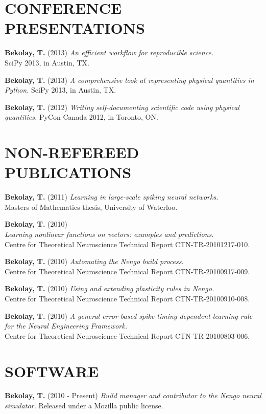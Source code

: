 \documentclass[line,margin]{res}
\begin{document}
\begin{resume}
\section{CONFERENCE \\PRESENTATIONS}
  \textbf{Bekolay, T.} (2013)
    {\sl An efficient workflow for reproducible science.} \\
    SciPy 2013, in Austin, TX.

  \textbf{Bekolay, T.} (2013)
    {\sl A comprehensive look at representing physical quantities in Python.}
    SciPy 2013, in Austin, TX.

  \textbf{Bekolay, T.} (2012)
    {\sl Writing self-documenting scientific code using physical quantities.}
    PyCon Canada 2012, in Toronto, ON.

\section{NON-REFEREED \\PUBLICATIONS}
  \textbf{Bekolay, T.} (2011)
    {\sl Learning in large-scale spiking neural networks.} \\
    Masters of Mathematics thesis, University of Waterloo.

  \textbf{Bekolay, T.} (2010) \\
    {\sl Learning nonlinear functions on vectors: examples and predictions.} \\
      Centre for Theoretical Neuroscience Technical Report CTN-TR-20101217-010.

  \textbf{Bekolay, T.} (2010)
    {\sl Automating the Nengo build process.} \\
    Centre for Theoretical Neuroscience Technical Report CTN-TR-20100917-009.

  \textbf{Bekolay, T.} (2010)
    {\sl Using and extending plasticity rules in Nengo.} \\
    Centre for Theoretical Neuroscience Technical Report CTN-TR-20100910-008.

  \textbf{Bekolay, T.} (2010)
    {\sl A general error-based spike-timing dependent learning rule for the Neural Engineering Framework.} \\
    Centre for Theoretical Neuroscience Technical Report CTN-TR-20100803-006.

\section{SOFTWARE}
  \textbf{Bekolay, T.} (2010 - Present)
    {\sl Build manager and contributor to the Nengo neural simulator.}
    Released under a Mozilla public license.


\end{resume}
\end{document}
